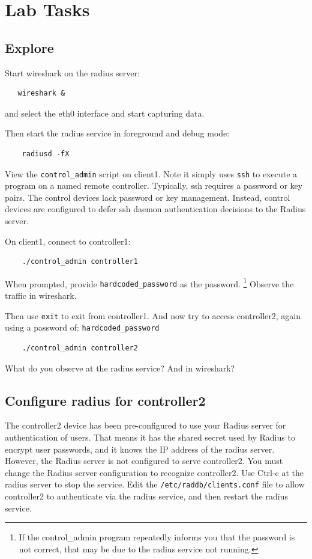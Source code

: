 \section{Lab Tasks}
\subsection{Explore}
Start wireshark on the radius server:
\begin{verbatim}
   wireshark &
\end{verbatim}
\noindent and select the eth0 interface and start capturing data.

Then start the radius service in foreground and debug mode:
\begin{verbatim}
    radiusd -fX
\end{verbatim}

View the {\tt control\_admin} script on client1.  Note it simply uses {\tt ssh} to execute a program
on a named remote controller.  Typically, ssh requires a password or key pairs.  The control devices
lack password or key management.  Instead, control devices are configured to defer ssh daemon authentication decisions to
the Radius server.

On client1, connect to controller1:
\begin{verbatim}
    ./control_admin controller1
\end{verbatim}
\noindent When prompted, provide {\tt hardcoded\_password} as the password.
\footnote{If the control\_admin program
repeatedly informs you that the password is not correct, that may be
due to the radius service not running.}
Observe the traffic in wireshark. 

Then use {\tt exit} to exit from controller1.  And now try to access
controller2, again using a password of: {\tt hardcoded\_password}
\begin{verbatim}
    ./control_admin controller2
\end{verbatim}
\noindent What do you observe at the radius service?  And in wireshark?

\subsection{Configure radius for controller2}
The controller2 device has been pre-configured to use your Radius server for 
authentication of users.  That means it has the shared secret used by Radius
to encrypt user passwords, and it knows the IP address of the radius server.
However, the Radius server is not configured to serve controller2.  You must
change the Radius server configuration to recognize controller2.
Use Ctrl-c at the radius server to stop the service.
Edit the {\tt /etc/raddb/clients.conf} file to allow controller2 to authenticate
via the radius service, and then restart the radius service.

